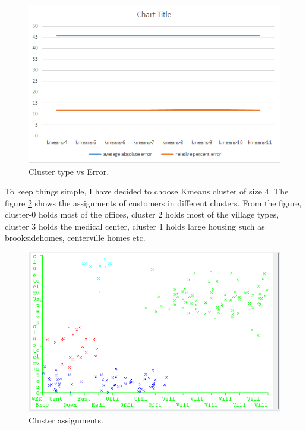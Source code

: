 \begin{figure}[h!]
  \includegraphics[width=\linewidth]{cluster-types-vs-error.png}
  \caption{Cluster type vs Error.}
  \label{fig:cluster-type-vs-error}
\end{figure}

To keep things simple, I have decided to choose Kmeans cluster of size 4. The figure \ref{fig:4-cluster-with-10-files} shows the assignments of customers in different clusters. From the figure, cluster-0 holds most of the offices, cluster 2 holds most of the village types, cluster 3 holds the medical center, cluster 1 holds large housing such as brooksidehomes, centerville homes etc.

\begin{figure}[h!]
  \includegraphics[width=\linewidth]{4-cluster-with-10-files.png}
  \caption{Cluster assignments.}
  \label{fig:4-cluster-with-10-files}
\end{figure}

